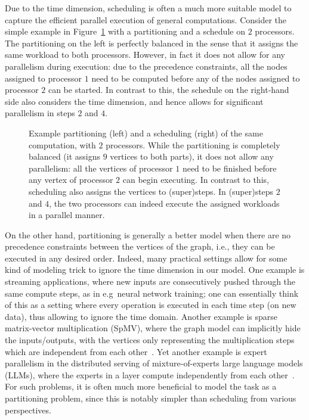 \documentclass[oneside,reqno, a4paper]{amsart}
\numberwithin{equation}{section}
\begin{document}
Due to the time dimension, scheduling is often a much more suitable model to capture the efficient parallel execution of general computations. Consider the simple example in Figure~\ref{fig:part_sched} with a partitioning and a schedule on $2$ processors. The partitioning on the left is perfectly balanced in the sense that it assigns the same workload to both processors. However, in fact it does not allow for any parallelism during execution: due to the precedence constraints, all the nodes assigned to processor $1$ need to be computed before any of the nodes assigned to processor $2$ can be started. In contrast to this, the schedule on the right-hand side also considers the time dimension, and hence allows for significant parallelism in steps $2$ and $4$.

\begin{figure}
	\centering
	\resizebox{1.0\textwidth}{!}{}
	\caption{
		Example partitioning (left) and a scheduling (right) of the same computation, with $2$ processors. While the partitioning is completely balanced (it assigns $9$ vertices to both parts), it does not allow any parallelism: all the vertices of processor $1$ need to be finished before any vertex of processor $2$ can begin executing. In contrast to this, scheduling also assigns the vertices to (super)steps. In (super)steps $2$ and $4$, the two processors can indeed execute the assigned workloads in a parallel manner.
	}
	\label{fig:part_sched}
\end{figure}

On the other hand, partitioning is generally a better model when there are no precedence constraints between the vertices of the graph, i.e., they can be executed in any desired order. Indeed, many practical settings allow for some kind of modeling trick to ignore the time dimension in our model. One example is streaming applications, where new inputs are consecutively pushed through the same compute steps, as in e.g\ neural network training; one can essentially think of this as a setting where every operation is executed in each time step (on new data), thus allowing to ignore the time domain. Another example is sparse matrix-vector multiplication (SpMV), where the graph model can implicitly hide the inputs/outputs, with the vertices only representing the multiplication steps which are independent from each other~\cite{knigge2020improved, jenneskens22exact}. Yet another example is expert parallelism in the distributed serving of mixture-of-experts large language models (LLMs), where the experts in a layer compute independently from each other~\cite{replication_opdas}. For such problems, it is often much more beneficial to model the task as a partitioning problem, since this is notably simpler than scheduling from various perspectives.
\end{document}
